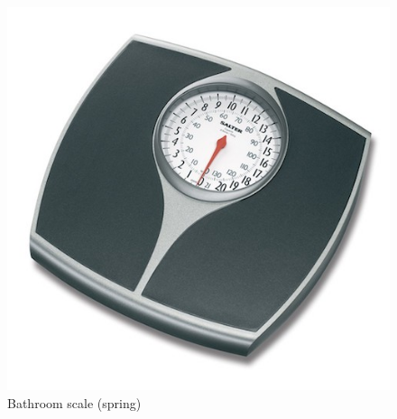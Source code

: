 \documentclass[12pt,]{book}
\theoremstyle{definition}
\theoremstyle{definition}
\theoremstyle{definition}
\theoremstyle{remark}
\begin{document}
\begin{figure}

{\centering \includegraphics[width=6.94in]{images/springScale} 

}

\caption{Bathroom scale (spring)}\label{fig:weight1}
\end{figure}
\end{document}
